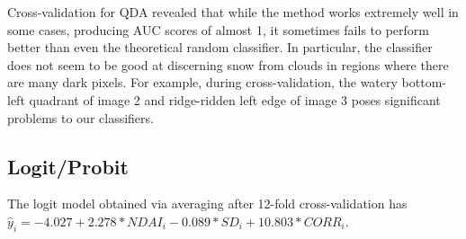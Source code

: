 \documentclass{article}\usepackage[]{graphicx}\usepackage[]{color}
\begin{document}
Cross-validation for QDA revealed that while the method works extremely well in some cases, producing AUC scores of almost 1, it sometimes fails to perform better than even the theoretical random classifier.  In particular, the classifier does not seem to be good at discerning snow from clouds in regions where there are many dark pixels.  For example, during cross-validation, the watery bottom-left quadrant of image 2 and ridge-ridden left edge of image 3 poses significant problems to our classifiers.

\subsection{Logit/Probit}
The logit model obtained via averaging after 12-fold cross-validation has $\hat{y}_i = -4.027 + 2.278 * NDAI_i - 0.089 * SD_i + 10.803 * CORR_i.$
\end{document}
